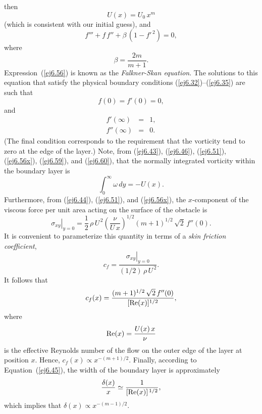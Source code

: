 then
\begin{equation}\label{ej6.56x}
U(x) = U_0\,x^m
\end{equation}
(which is consistent with our initial guess), 
and
\begin{equation}\label{ej6.56}
f'''+f\,f'' + \beta\,(1-f'^{\,2}) = 0,
\end{equation}
where 
\begin{equation}
\beta = \frac{2m}{m+1}.
\end{equation}
Expression~(\ref{ej6.56}) is known as the {\em Falkner-Skan equation}.
The solutions to this equation that satisfy the physical boundary conditions (\ref{ej6.32})--(\ref{ej6.35}) are such that
\begin{equation}
f(0) = f'(0) = 0,\label{ej6.59}
\end{equation}
and
\begin{eqnarray}
f'(\infty)&=&1,\label{ej6.60}\\[0.5ex]
f''(\infty) &=& 0.\label{ej6.61}
\end{eqnarray}
(The final condition corresponds to the requirement that the vorticity tend to zero at the edge of the layer.)
Note, from (\ref{ej6.43}), (\ref{ej6.46}), (\ref{ej6.51}), (\ref{ej6.56x}), (\ref{ej6.59}), and (\ref{ej6.60}),  that the normally  integrated
vorticity within the boundary layer is
\begin{equation}
\int_0^\infty \omega\,dy = -U(x).
\end{equation}
Furthermore, from (\ref{ej6.44}), (\ref{ej6.51}), and (\ref{ej6.56x}), the $x$-component of the viscous force per unit area acting on the surface of
the obstacle is
\begin{equation}\label{ej6.63}
\left.\sigma_{xy}\right|_{y=0} =\frac{1}{2}\,\rho\,U^{\,2}\left(\frac{\nu}{U\,x}\right)^{1/2}(m+1)^{1/2}\,\sqrt{2}\,f''(0).
\end{equation}
It is convenient to parameterize this quantity in terms of a {\em skin friction coefficient},
\begin{equation}
c_f = \frac{\left.\sigma_{xy}\right|_{y=0}}{(1/2)\,\rho\,U^{\,2}}.
\end{equation}
It follows that
\begin{equation}
c_f(x) = \frac{(m+1)^{1/2}\,\sqrt{2}\,f''(0)}{[{\rm Re}(x)]^{1/2}},
\end{equation}
where
\begin{equation}
{\rm Re}(x) = \frac{U(x)\,x}{\nu}
\end{equation}
is the effective Reynolds number  of the flow on the outer edge of the layer at position $x$. Hence,  $c_f(x)\propto x^{-(m+1)/2}$. 
Finally, according to Equation~(\ref{ej6.45}), the width of the boundary layer is approximately
\begin{equation}
\frac{\delta(x)}{x} \simeq \frac{1}{[{\rm Re}(x)]^{\,1/2}},
\end{equation}
which implies that $\delta(x)\propto x^{-(m-1)/2}$. 

